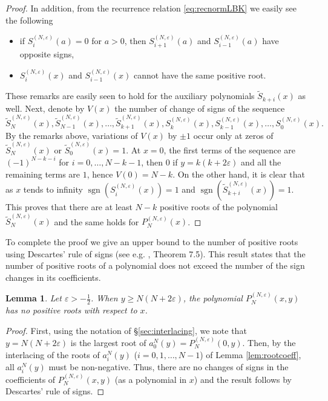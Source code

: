 \documentclass[11pt]{article}
\numberwithin{equation}{section}
\newcommand{\e}{\varepsilon}
\newcommand{\cp}[2]{P^{(#1)}_{#2}} %
\DeclareMathOperator{\sgn}{sgn}
\theoremstyle{plain}
\newtheorem{lem}[thm]{Lemma}
\theoremstyle{definition}
\theoremstyle{remark}
\begin{document}
\begin{proof}
  In addition, from the recurrence relation \eqref{eq:recnormLBK} we easily see the following
  \begin{itemize}
  \item if \(S_{i}^{(N,\e)}(a) = 0\) for \(a > 0 \), then \(S_{i+1}^{(N,\e)}(a)\)
    and \(S_{i-1}^{(N,\e)}(a)\) have opposite signs,
  \item \(S_{i}^{(N,\e)}(x)\) and \(S_{i-1}^{(N,\e)}(x)\) cannot
    have the same positive root.
  \end{itemize}
  These remarks are easily seen to hold for the auxiliary polynomials \(\tilde{S}_{k+i}(x)\) as well. Next, denote by \(V(x)\) the number
  of change of signs  of the sequence
  \[
    \tilde{S}_N^{(N,\e)}(x), \tilde{S}_{N-1}^{(N,\e)}(x), \ldots, \tilde{S}_{k+1}^{(N,\e)}(x), S_{k}^{(N,\e)}(x),
    S_{k-1}^{(N,\e)}(x), \ldots, S_0^{(N,\e)}(x).
  \]
  By the remarks above, variations of \(V(x)\) by \(\pm 1\) occur only at zeros of \(\tilde{S}_N^{(N,\e)}(x)\) or \(\tilde{S}_0^{(N,\e)}(x) = 1\).
  At \(x=0\), the first terms of the sequence are \( (-1)^{N-k-i}\) for \(i=0,\ldots,N-k-1\), then \(0\) if \( y = k(k+2\e)\) and all the remaining
  terms are \( 1\), hence \(V(0)= N-k \). On the other hand, it is clear that as \(x\) tends to infinity \(\sgn(S^{(N,\e)}_i(x))= 1\) and
  \(\sgn(\tilde{S}^{(N,\e)}_{k+i}(x))= 1\). This proves that there are at least \(N-k\) positive roots of the polynomial \(\tilde{S}_N^{(N,\e)}(x)\) and
  the same holds for \(\cp{N,\e}{N}(x)\). 
\end{proof}

To complete the proof we give an upper bound to the number of positive roots using Descartes' rule of
signs (see e.g. \cite{K2008}, Theorem 7.5). This result states that the number of positive roots
of a polynomial does not exceed the number of the sign changes in its coefficients.

\begin{lem} \label{lem:upperBN}
  Let \( \e > -\frac12 \). When \(y \geq N(N + 2\e)\), the polynomial \(\cp{N,\e}{N}(x,y)\) has no positive
  roots with respect to \(x\).
\end{lem}

\begin{proof}
  First, using the notation of \S \ref{sec:interlacing}, we note that \(y = N(N + 2\e)\) is the largest
  root of \(a_0^{N}(y) = \cp{N,\e}{N}(0,y)\). Then, by the interlacing of the roots of \(a_i^{N}(y)\) (\(i=0,1,\ldots,N-1\)) of
  Lemma \ref{lem:rootcoeff}, all \(a_i^{N}(y)\) must be non-negative. Thus, there are no changes of signs
  in the coefficients of \(\cp{N,\e}{N}(x,y)\) (as a polynomial in \(x\)) and the result follows by
  Descartes' rule of signs. 
\end{proof}
\end{document}
